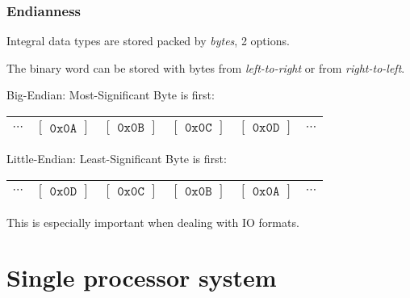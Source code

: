 \begin{frame}
  \frametitle{Endianness}

Integral data types are stored packed by \textit{bytes}, 2 options.

The binary word can be stored with bytes from \textit{left-to-right} or from \textit{right-to-left}.

\bigskip
Big-Endian: Most-Significant Byte is first:

\bigskip
\begin{tabular}{c|cccc|c}
\hline
$\cdots$ & $\begin{bmatrix}\texttt{0x0A}\end{bmatrix}$ 
         & $\begin{bmatrix}\texttt{0x0B}\end{bmatrix}$ 
         & $\begin{bmatrix}\texttt{0x0C}\end{bmatrix}$ 
         & $\begin{bmatrix}\texttt{0x0D}\end{bmatrix}$ & $\cdots$ \\
\hline
\end{tabular}

\bigskip
Little-Endian: Least-Significant Byte is first:

\bigskip
\begin{tabular}{c|cccc|c}
\hline
$\cdots$ & $\begin{bmatrix}\texttt{0x0D}\end{bmatrix}$ 
         & $\begin{bmatrix}\texttt{0x0C}\end{bmatrix}$ 
         & $\begin{bmatrix}\texttt{0x0B}\end{bmatrix}$ 
         & $\begin{bmatrix}\texttt{0x0A}\end{bmatrix}$ & $\cdots$ \\
\hline
\end{tabular}

\medskip
This is especially important when dealing with IO formats.

\end{frame}

\section{Single processor system}

